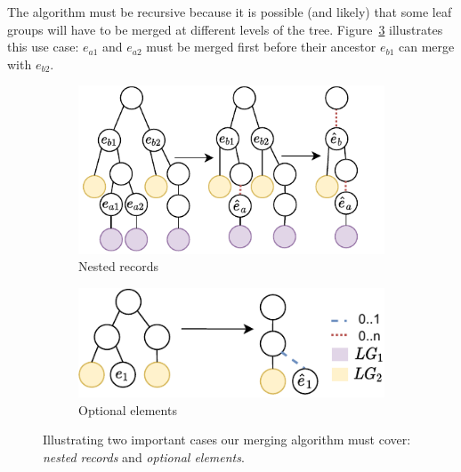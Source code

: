 The algorithm must be recursive because it is possible (and likely) that some leaf groups will have to be merged at different levels of the tree. 
Figure~\ref{fig:intra-use-cases} illustrates this use case: $e_{a1}$ and $e_{a2}$ must be merged first before their ancestor $e_{b1}$ can merge with $e_{b2}$.

\begin{figure}[ht]
  \centering
  \begin{subfigure}{0.4\textwidth}
    \centering
    \includegraphics[width=.9\linewidth]{appstract/explanations/intra-recursivity}
    \caption{Nested records}
    \label{fig:nested_records}
  \end{subfigure}
  \begin{subfigure}{0.4\textwidth}
    \centering 
    \includegraphics[width=.9\linewidth]{appstract/explanations/intra-optional}
    \caption{Optional elements}
    \label{fig:optional_elements}
  \end{subfigure}
  \caption{Illustrating two important cases our merging algorithm must cover: \emph{nested records} and \emph{optional elements}.}
  \label{fig:intra-use-cases}
\end{figure}

